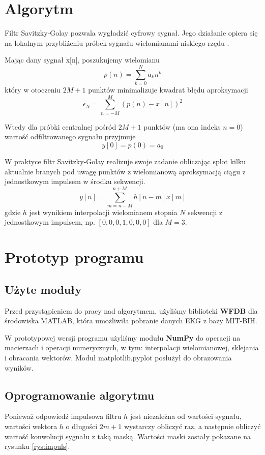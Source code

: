 \section{Algorytm}

Filtr Savitzky-Golay pozwala wygładzić cyfrowy sygnał. Jego działanie opiera się na lokalnym przybliżeniu próbek sygnału wielomianami niskiego rzędu \cite{whatissg}.

Mając dany sygnał x[n], poszukujemy wielomianu
\begin{equation}
p(n) = \sum\limits_{k=0}^N a_k n^k
\end{equation}
który w otoczeniu $2M+1$ punktów minimalizuje kwadrat błędu aproksymacji
\begin{equation}
\epsilon_N = \sum\limits_{n=-M}^M (p(n) - x[n])^2
\end{equation}

Wtedy dla próbki centralnej pośród $2M+1$ punktów (ma ona indeks $n=0$) wartość odfiltrowanego sygnału przyjmuje
\begin{equation}
y[0] = p(0) = a_0
\end{equation}

W praktyce filtr Savitzky-Golay realizuje swoje zadanie obliczając splot kilku aktualnie branych pod uwagę punktów z wielomianową aproksymacją ciągu z jednostkowym impulsem w środku sekwencji.
\begin{equation}
y[n] = \sum\limits_{m=n-M}^{n+M} h[n-m] x[m]
\end{equation}
gdzie $h$ jest wynikiem interpolacji wielomianem stopnia $N$ sekwencji z jednostkowym impulsem, np. $[0, 0, 0, 1, 0, 0, 0]$ dla $M=3$.


\newpage
\section{Prototyp programu}
\subsection{Użyte moduły}
Przed przystąpieniem do pracy nad algorytmem, użyliśmy biblioteki \textbf{WFDB} dla środowiska MATLAB, która umożliwiła pobranie danych EKG z bazy MIT-BIH\cite{mit-bih}.

W prototypowej wersji programu użyliśmy modułu \textbf{NumPy} do operacji na macierzach i operacji numerycznych, w tym: interpolacji wielomianowej, sklejania i obracania wektorów. 
Moduł matplotlib.pyplot posłużył do obrazowania wyników.

\subsection{Oprogramowanie algorytmu}
Ponieważ odpowiedź impulsowa filtru $h$ jest niezależna od wartości sygnału, wartości wektora $h$ o długości $2m+1$ wystarczy obliczyć raz, a następnie obliczyć wartość konwolucji sygnału z taką maską. Wartości maski zostały pokazane na rysunku \ref{rys:impuls}.

